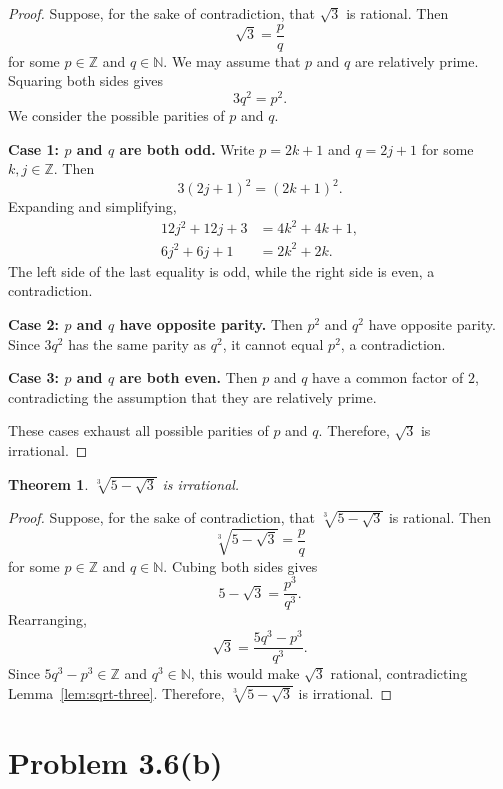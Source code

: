\documentclass{article}
\newtheorem{theorem}{Theorem}
\theoremstyle{definition}
\begin{document}
\begin{proof}
Suppose, for the sake of contradiction, that \(\sqrt{3}\) is rational.
Then
\[
\sqrt{3}=\frac{p}{q}
\]
for some \(p\in\mathbb{Z}\) and \(q\in\mathbb{N}\).
We may assume that \(p\) and \(q\) are relatively prime.
Squaring both sides gives
\[
3q^2=p^2.
\]
We consider the possible parities of \(p\) and \(q\).

\textbf{Case 1: \(p\) and \(q\) are both odd.}
Write \(p=2k+1\) and \(q=2j+1\) for some \(k,j\in\mathbb{Z}\).
Then
\[
3(2j+1)^2=(2k+1)^2.
\]
Expanding and simplifying,
\begin{align*}
12j^2+12j+3&=4k^2+4k+1,\\
6j^2+6j+1&=2k^2+2k.
\end{align*}
The left side of the last equality is odd, while the right side is even, a contradiction.

\textbf{Case 2: \(p\) and \(q\) have opposite parity.}
Then \(p^2\) and \(q^2\) have opposite parity.
Since \(3q^2\) has the same parity as \(q^2\), it cannot equal \(p^2\), a contradiction.

\textbf{Case 3: \(p\) and \(q\) are both even.}
Then \(p\) and \(q\) have a common factor of \(2\), contradicting the assumption that they are relatively prime.

These cases exhaust all possible parities of \(p\) and \(q\).
Therefore, \(\sqrt{3}\) is irrational.
\end{proof}

\begin{theorem}
\(\sqrt[3]{5-\sqrt{3}}\) is irrational.
\end{theorem}

\begin{proof}
Suppose, for the sake of contradiction, that \(\sqrt[3]{5-\sqrt{3}}\) is rational.
Then
\[
\sqrt[3]{5-\sqrt{3}}=\frac{p}{q}
\]
for some \(p\in\mathbb{Z}\) and \(q\in\mathbb{N}\).
Cubing both sides gives
\[
5-\sqrt{3}=\frac{p^3}{q^3}.
\]
Rearranging,
\[
\sqrt{3}=\frac{5q^3-p^3}{q^3}.
\]
Since \(5q^3-p^3\in\mathbb{Z}\) and \(q^3\in\mathbb{N}\), this would make \(\sqrt{3}\) rational, contradicting Lemma~\ref{lem:sqrt-three}.
Therefore, \(\sqrt[3]{5-\sqrt{3}}\) is irrational.
\end{proof}

\clearpage
\section{Problem 3.6(b)}
\end{document}
